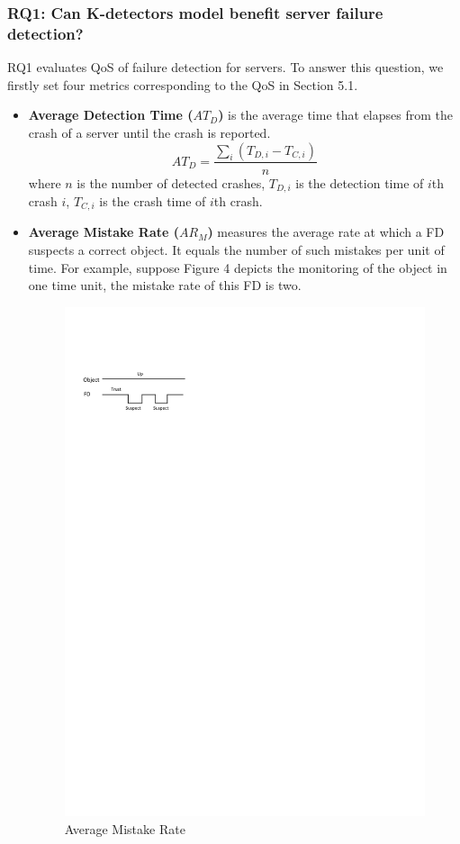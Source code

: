 \documentclass{sig-alternate-05-2015}
\begin{document}
\subsubsection*{RQ1: Can K-detectors model benefit server failure detection?}
\quad RQ1 evaluates QoS of failure detection for servers. To answer this question, we firstly set four metrics \cite{chen2002quality} corresponding to the QoS in Section 5.1.
\begin{itemize}
  \item \textbf{Average Detection Time ($AT_D$)} is the average time that elapses from the crash of a server until the crash is reported.
  \begin{equation}
    AT_D = \frac{\sum_i(T_{D,i} - T_{C,i})}{n}
  \end{equation}
  where $n$ is the number of detected crashes, $T_{D,i}$ is the detection time of $i$th crash $i$, $T_{C,i}$ is the crash time of $i$th crash.

  \item \textbf{Average Mistake Rate ($AR_M$)} measures the average rate at which a FD suspects a correct object. It equals the number of such mistakes per unit of time. For example, suppose Figure 4 depicts the monitoring of the object in one time unit, the mistake rate of this FD is two.
\begin{figure}[t]
  \centering
  \includegraphics{metric}
  \caption{Average Mistake Rate}
\end{figure}


\end{itemize}
\end{document}
